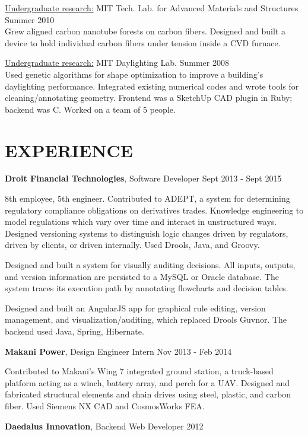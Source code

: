 \documentclass[margin]{res}
\begin{document}
\begin{resume}
		\underline{Undergraduate research:} MIT Tech. Lab. for Advanced Materials and Structures \hfill Summer 2010 \\
		Grew aligned carbon nanotube forests on carbon fibers. Designed and built a device to hold individual carbon fibers under tension inside a CVD furnace.

		\underline{Undergraduate research:} MIT Daylighting Lab. \hfill Summer 2008 \\
		Used genetic algorithms for shape optimization to improve a building's daylighting performance. Integrated existing numerical codes and wrote tools for cleaning/annotating geometry. Frontend was a SketchUp CAD plugin in Ruby; backend was C. Worked on a team of 5 people. 


	\section{EXPERIENCE}

		{\bf Droit Financial Technologies}, Software Developer \hfill Sept 2013 - Sept 2015
		
		8th employee, 5th engineer. Contributed to ADEPT, a system for determining regulatory compliance obligations on derivatives trades. Knowledge engineering to model regulations which vary over time and interact in unstructured ways. Designed versioning systems to distinguish logic changes driven by regulators, driven by clients, or driven internally. Used Drools, Java, and Groovy.

		Designed and built a system for visually auditing decisions. All inputs, outputs, and version information are persisted to a MySQL or Oracle database. The system traces its execution path by annotating flowcharts and decision tables.

		Designed and built an AngularJS app for graphical rule editing, version management, and visualization/auditing, which replaced Drools Guvnor. The backend used Java, Spring, Hibernate.
	

		{\bf Makani Power}, Design Engineer Intern \hfill Nov 2013 - Feb 2014

		Contributed to Makani's Wing 7 integrated ground station, a truck-based platform acting as a winch, battery array, and perch for a UAV. Designed and fabricated structural elements and chain drives using steel, plastic, and carbon fiber. Used Siemens NX CAD and CosmosWorks FEA.

		 {\bf Daedalus Innovation}, Backend Web Developer \hfill 2012


\end{resume}
\end{document}
